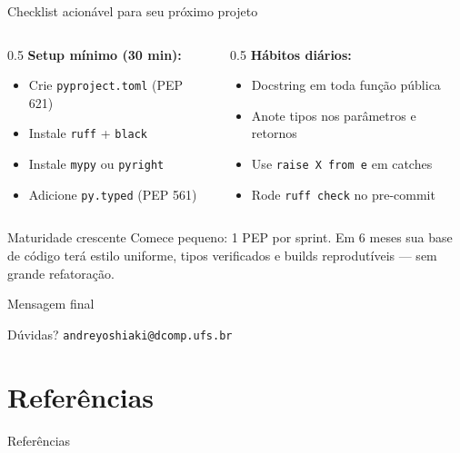 \documentclass[aspectratio=169]{beamer}
\begin{document}
\begin{frame}{Checklist acionável para seu próximo projeto}
  \begin{columns}[T]
    \begin{column}{0.5\textwidth}
      \textbf{Setup mínimo (30 min):}
      \begin{itemize}
        \item Crie \texttt{pyproject.toml} (PEP 621)
        \item Instale \texttt{ruff} + \texttt{black}
        \item Instale \texttt{mypy} ou \texttt{pyright}
        \item Adicione \texttt{py.typed} (PEP 561)
      \end{itemize}
    \end{column}
    \begin{column}{0.5\textwidth}
      \textbf{Hábitos diários:}
      \begin{itemize}
        \item Docstring em toda função pública
        \item Anote tipos nos parâmetros e retornos
        \item Use \texttt{raise X from e} em catches
        \item Rode \texttt{ruff check} no pre-commit
      \end{itemize}
    \end{column}
  \end{columns}
  \vspace{0.6em}
  \begin{exampleblock}{Maturidade crescente}
    Comece pequeno: 1 PEP por sprint. Em 6 meses sua base de código terá
    estilo uniforme, tipos verificados e builds reprodutíveis --- sem grande
    refatoração.
  \end{exampleblock}
\end{frame}

\begin{frame}{Mensagem final}
  \begin{center}
  \end{center}
  \vspace{0.8em}
  \begin{center}
    \small Dúvidas? \texttt{andreyoshiaki@dcomp.ufs.br}
  \end{center}
\end{frame}

\section*{Referências}
\begin{frame}[allowframebreaks]{Referências}
  \nocite{*}
  
  
\end{frame}
\end{document}
